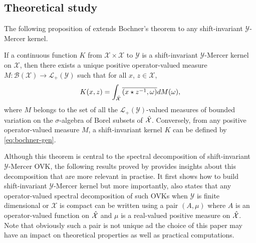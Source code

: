 \subsection{Theoretical study}
The following proposition of \citet{Zhang2012,Carmeli2010} extends Bochner's theorem to any shift-invariant $\mathcal{Y}$-Mercer kernel. 
\begin{proposition}\label{eq:bochner-gen}
If a continuous function $K$ from $\mathcal{X} \times \mathcal{X}$ to $\mathcal{Y}$ is a shift-invariant $\mathcal{Y}$-Mercer kernel on $\mathcal{X}$, then there exists a unique positive operator-valued measure $M: \mathcal{B}(\mathcal{X}) \to \mathcal{L}_+(\mathcal{Y})$ such that for all $x$, $z \in \mathcal{X}$,
\begin{dmath}
K(x, z) = \int_{\dual{\mathcal{X}}} \conj{\pairing{x \groupop \inv{z}, \omega}} dM(\omega),
\end{dmath}
where $M$ belongs to the set of all the $\mathcal{L}_+(\mathcal{Y})$-valued measures of bounded variation on the $\sigma$-algebra of Borel subsets of $\hat{\mathcal{X}}$. Conversely, from any positive operator-valued measure $M$, a shift-invariant kernel $K$ can be defined by \cref{eq:bochner-gen}. 
\end{proposition}
Although this theorem is central to the spectral decomposition of shift-invariant $\mathcal{Y}$-Mercer \acs{OVK}, the following results proved by \citet{Carmeli2010} provides insights about this decomposition that are more relevant in practise. It first shows how to build shift-invariant $\mathcal{Y}$-Mercer kernel but more importantly, also states that any operator-valued spectral decomposition of such \acs{OVK}s when $\mathcal{Y}$ is finite dimensional or $\mathcal{X}$ is compact can be written using a pair $(A, \mu)$ where $A$ is an operator-valued function on $\hat{\mathcal{X}}$ and $\mu$ is a real-valued positive measure on $\hat{\mathcal{X}}$. Note that obviously such a pair is not unique ad the choice of this paper may have an impact on theoretical properties as well as practical computations.
